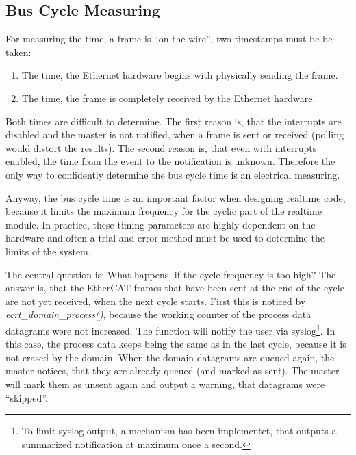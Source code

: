 \documentclass[a4paper,12pt,BCOR6mm,bibtotoc,idxtotoc]{scrbook}
\begin{document}

\subsection{Bus Cycle Measuring}
\label{sec:timing-bus}

For measuring the time, a frame is ``on the wire'', two timestamps
must be be taken:

\begin{enumerate}
\item The time, the Ethernet hardware begins with physically sending
  the frame.
\item The time, the frame is completely received by the Ethernet
  hardware.
\end{enumerate}

Both times are difficult to determine. The first reason is, that the
interrupts are disabled and the master is not notified, when a frame
is sent or received (polling would distort the results). The second
reason is, that even with interrupts enabled, the time from the event
to the notification is unknown. Therefore the only way to confidently
determine the bus cycle time is an electrical measuring.

Anyway, the bus cycle time is an important factor when designing
realtime code, because it limits the maximum frequency for the cyclic
part of the realtime module. In practice, these timing parameters are
highly dependent on the hardware and often a trial and error method
must be used to determine the limits of the system.

The central question is: What happens, if the cycle frequency is too
high? The answer is, that the EtherCAT frames that have been sent at
the end of the cycle are not yet received, when the next cycle starts.
First this is noticed by \textit{ecrt\_domain\_process()}, because the
working counter of the process data datagrams were not increased. The
function will notify the user via syslog\footnote{To limit syslog
  output, a mechanism has been implementet, that outputs a summarized
  notification at maximum once a second.}. In this case, the process
data keeps being the same as in the last cycle, because it is not
erased by the domain. When the domain datagrams are queued again, the
master notices, that they are already queued (and marked as sent). The
master will mark them as unsent again and output a warning, that
datagrams were ``skipped''.
\end{document}
